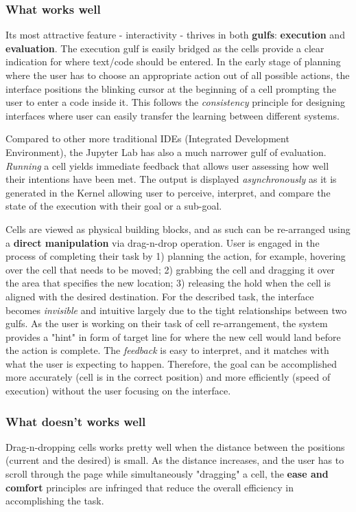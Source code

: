\documentclass[12pt,letterpaper]{article}
\begin{document}
\subsubsection*{What works well}
Its most attractive feature - interactivity - thrives in both \textbf{gulfs}: \textbf{execution} and \textbf{evaluation}. The execution gulf is easily bridged as the cells provide a clear indication for where text/code should be entered. In the early stage of planning where the user has to choose an appropriate action out of all possible actions, the interface positions the blinking cursor at the beginning of a cell prompting the user to enter a code inside it. This follows the \textit{consistency} principle for designing interfaces where user can easily transfer the learning between different systems.

Compared to other more traditional IDEs (Integrated Development Environment), the Jupyter Lab has also a much narrower gulf of evaluation. \textit{Running} a cell yields immediate feedback that allows user assessing how well their intentions have been met. The output is displayed \textit{asynchronously} as it is generated in the Kernel allowing user to perceive, interpret, and compare the state of the execution with their goal or a sub-goal.

Cells are viewed as physical building blocks, and as such can be re-arranged using a \textbf{direct manipulation} via drag-n-drop operation. User is engaged in the process of completing their task by 1) planning the action, for example, hovering over the cell that needs to be moved; 2) grabbing the cell and dragging it over the area that specifies the new location; 3) releasing the hold when the cell is aligned with the desired destination. For the described task, the interface becomes \textit{invisible} and intuitive largely due to the tight relationships between two gulfs. As the user is working on their task of cell re-arrangement, the system provides a "hint" in form of target line for where the new cell would land before the action is complete. The \textit{feedback} is easy to interpret, and it matches with what the user is expecting to happen. Therefore, the goal can be accomplished more accurately (cell is in the correct position) and more efficiently (speed of execution) without the user focusing on the interface.


\subsubsection*{What doesn't works well}
Drag-n-dropping cells works pretty well when the distance between the positions (current and the desired) is small. As the distance increases, and the user has to scroll through the page while simultaneously "dragging" a cell, the \textbf{ease and comfort} principles are infringed that reduce the overall efficiency in accomplishing the task. 
\end{document}
